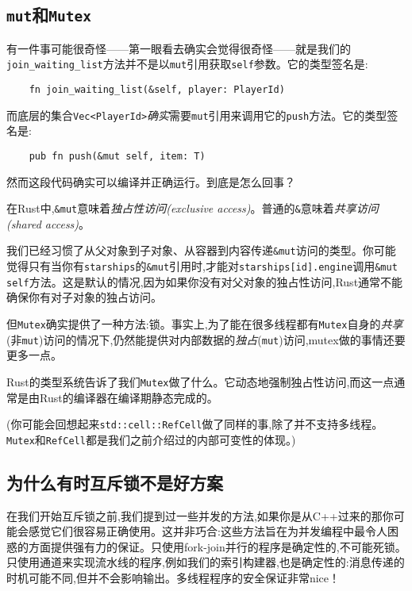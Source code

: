 \subsection{\texttt{mut}和\texttt{Mutex}}\label{MutAndMutex}
有一件事可能很奇怪——第一眼看去确实会觉得很奇怪——就是我们的\texttt{join\_waiting\_list}方法并不是以\texttt{mut}引用获取\texttt{self}参数。它的类型签名是:
\begin{verbatim}
    fn join_waiting_list(&self, player: PlayerId)
\end{verbatim}

而底层的集合\texttt{Vec<PlayerId>}\emph{确实}需要\texttt{mut}引用来调用它的\texttt{push}方法。它的类型签名是:
\begin{verbatim}
    pub fn push(&mut self, item: T)
\end{verbatim}

然而这段代码确实可以编译并正确运行。到底是怎么回事？

在Rust中,\texttt{\&mut}意味着\emph{独占性访问(exclusive access)}。普通的\texttt{\&}意味着\emph{共享访问(shared access)}。

我们已经习惯了从父对象到子对象、从容器到内容传递\texttt{\&mut}访问的类型。你可能觉得只有当你有\texttt{starships}的\texttt{\&mut}引用时,才能对\texttt{starships[id].engine}调用\texttt{\&mut self}方法。这是默认的情况,因为如果你没有对父对象的独占性访问,Rust通常不能确保你有对子对象的独占访问。

但\texttt{Mutex}确实提供了一种方法:锁。事实上,为了能在很多线程都有\texttt{Mutex}自身的\emph{共享}(非\texttt{mut})访问的情况下,仍然能提供对内部数据的\emph{独占}(\texttt{mut})访问,mutex做的事情还要更多一点。

Rust的类型系统告诉了我们\texttt{Mutex}做了什么。它动态地强制独占性访问,而这一点通常是由Rust的编译器在编译期静态完成的。

(你可能会回想起来\texttt{std::cell::RefCell}做了同样的事,除了并不支持多线程。\texttt{Mutex}和\texttt{RefCell}都是我们之前介绍过的内部可变性的体现。)

\subsection{为什么有时互斥锁不是好方案}
在我们开始互斥锁之前,我们提到过一些并发的方法,如果你是从C++过来的那你可能会感觉它们很容易正确使用。这并非巧合:这些方法旨在为并发编程中最令人困惑的方面提供强有力的保证。只使用fork-join并行的程序是确定性的,不可能死锁。只使用通道来实现流水线的程序,例如我们的索引构建器,也是确定性的:消息传递的时机可能不同,但并不会影响输出。多线程程序的安全保证非常nice！

